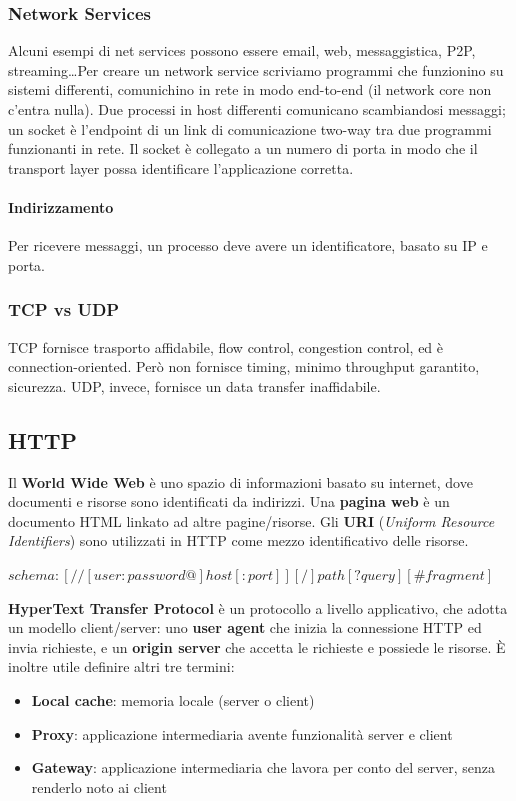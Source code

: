 \documentclass[11pt]{article}
\newcommand{\code}[1]{\texttt{#1}}
\begin{document}
\subsubsection{Network Services}
Alcuni esempi di net services possono essere email, web, messaggistica, P2P, streaming\dots Per creare un network service scriviamo programmi che funzionino su sistemi differenti, comunichino in rete in modo end-to-end (il network core non c'entra nulla). Due processi in host differenti comunicano scambiandosi messaggi; un socket è l'endpoint di un link di comunicazione two-way tra due programmi funzionanti in rete. Il socket è collegato a un numero di porta in modo che il transport layer possa identificare l'applicazione corretta. 
\paragraph{Indirizzamento} Per ricevere messaggi, un processo deve avere un identificatore, basato su IP e porta. 
\subsubsection{TCP vs UDP} TCP fornisce trasporto affidabile, flow control, congestion control, ed è connection-oriented. Però non fornisce timing, minimo throughput garantito, sicurezza. UDP, invece, fornisce un data transfer inaffidabile. 
\subsection{HTTP}
Il \textbf{World Wide Web} è uno spazio di informazioni basato su internet, dove documenti e risorse sono identificati da indirizzi. Una \textbf{pagina web} è un documento HTML linkato ad altre pagine/risorse.
Gli \textbf{URI} (\textit{Uniform Resource Identifiers}) sono utilizzati in HTTP come mezzo identificativo delle risorse. 
\begin{center}
    \code{$schema:[//[user:password@]host[:port]][/]path[?query][\#fragment]$}
\end{center}
\textbf{HyperText Transfer Protocol} è un protocollo a livello applicativo, che adotta un modello client/server: uno \textbf{user agent} che inizia la connessione HTTP ed invia richieste, e un \textbf{origin server} che accetta le richieste e possiede le risorse. È inoltre utile definire altri tre termini:
\begin{itemize}
    \item \textbf{Local cache}: memoria locale (server o client)
    \item \textbf{Proxy}: applicazione intermediaria avente funzionalità server e client 
    \item \textbf{Gateway}: applicazione intermediaria che lavora per conto del server, senza renderlo noto ai client 
\end{itemize}
\end{document}
